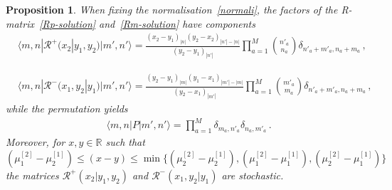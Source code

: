 \documentclass[11pt]{article}
\numberwithin{equation}{section}
\newtheorem{proposition}[theorem]{Proposition}
\newcommand{\M}{M}
\newcommand{\eR}{\mathcal{R}}
\begin{document}
                
		 		\begin{proposition}\label{Proposition-R-components}
		 			When fixing the normalisation~\eqref{normali},
		 			the factors of the R-matrix~\eqref{Rp-solution} and~\eqref{Rm-solution} have components
		 			\begin{equation}\label{element-M}
		 				\begin{split}
		 					&\langle m,n|  \eR^+(x_2|y_1,y_2) |m',n'\rangle =  \frac{(x_2-y_1)_{|n|} (y_2-x_2)_{|n'|-|n|}}{(y_2-y_1)_{|n'|} }\prod_{a=1}^{\M}\binom{n'_a}{n_a}\delta_{n'_a+m'_a,n_a+m_a}\,,
		 				\end{split}
		 			\end{equation}
		 			
		 			\begin{equation}\label{element-N}
		 				\begin{split}
		 					&\langle m,n|  \eR^-(x_1,y_2|y_1) |m',n'\rangle = \frac{(y_2-y_1)_{|m|} (y_1-x_1)_{|m'|-|m|}}{(y_2-x_1)_{|m'|} }\prod_{a=1}^{\M}\binom{m'_a}{m_a}\delta_{n'_a+m'_a,n_a+m_a}\,,
		 				\end{split}
		 			\end{equation}
		 			while the permutation yields
		 			\begin{equation}\label{permutation-elements}
		 				\begin{split}
		 					&\langle m,n|  P |m',n'\rangle =\prod_{a=1}^{\M}\delta_{m_a,n'_a}\delta_{n_a,m'_a}\,.
		 				\end{split}
		 			\end{equation}
                 Moreover, for $x,y\in \mathbb{R}$ such that $(\mu_{1}^{[2]}-\mu_{2}^{[1]})\leq (x-y)\leq \min\{(\mu_{2}^{[2]}-\mu_{2}^{[1]}),(\mu_{1}^{[2]}-\mu_{1}^{[1]}),(\mu_{2}^{[2]}-\mu_{1}^{[1]})\}$ the matrices $\eR^{+}(x_2|y_1,y_2)$ and $\eR^{-}(x_1,y_2|y_1)$ are stochastic.
		 		\end{proposition}
\end{document}
